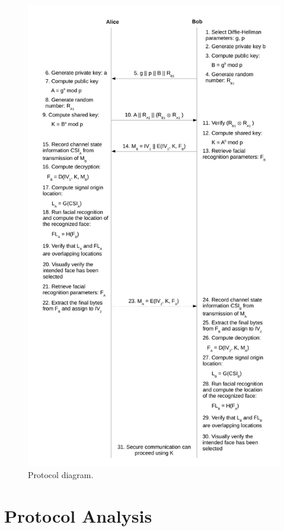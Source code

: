 \documentclass[12pt]{report}
\begin{document}
\begin{figure}[!htb]
    \begin{center}
        \caption{Protocol diagram.}
        \label{figure: protocol-diagram}
        \includegraphics[scale=0.4]{../figures/looks-good-to-me-protocol-diagram.pdf}
    \end{center}
\end{figure}

\section{Protocol Analysis}
\end{document}
